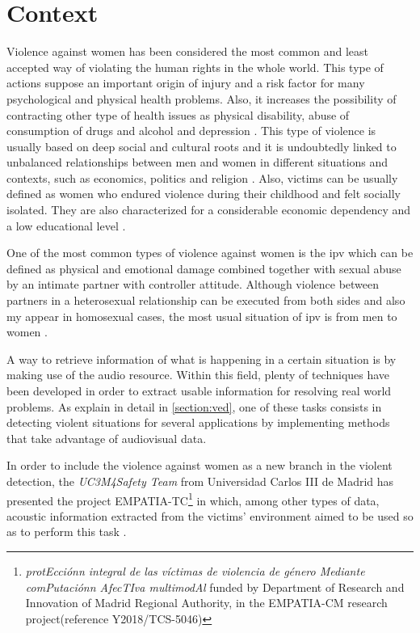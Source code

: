 \section{Context}

	Violence against women has been considered the most common and least accepted way of violating the human rights in the whole world. This type of actions suppose an important origin of injury and a risk factor for many psychological and physical health problems. Also, it increases the possibility of contracting other type of health issues as physical disability, abuse of consumption of drugs and alcohol and depression \cite{Heise1999}\cite{Watts2002}. This type of violence is usually based on deep social and cultural roots and it is undoubtedly linked to unbalanced relationships between men and women in different situations and contexts, such as economics, politics and religion \cite{Blanco2004}. Also, victims can be usually defined as women who endured violence during their childhood and felt socially isolated. They are also characterized for a considerable economic dependency and a low educational level \cite{Ruiz-Perez2006}.
	
	One of the most common types of violence against women is the \acrfull{ipv} which can be defined as physical and emotional damage combined together with sexual abuse by an intimate partner with controller attitude. Although violence between partners in a heterosexual relationship can be executed from both sides and also my appear in homosexual cases, the most usual situation of \acrshort{ipv} is from men to women \cite{WorldHealtOrganization2012}.

	A way to retrieve information of what is happening in a certain situation is by making use of the audio resource. Within this field, plenty of techniques have been developed in order to extract usable information for resolving real world problems. As explain in detail in \ref{section:ved}, one of these tasks consists in detecting violent situations for several applications by implementing methods that take advantage of audiovisual data.
	
	In order to include the violence against women as a new branch in the violent detection, the \textit{UC3M4Safety Team} from Universidad Carlos III de Madrid has presented the project EMPATIA-TC\footnote{\textit{protEcciónn integral de las víctimas de violencia de género Mediante comPutaciónn AfecTIva multimodAl} funded by Department  of  Research  and Innovation of Madrid Regional Authority, in the EMPATIA-CM research project(reference  Y2018/TCS-5046)} in which, among other types of data, acoustic information extracted from the victims' environment aimed to be used so as to perform this task \cite{UC3M4SafetyTeam2018}.
	
